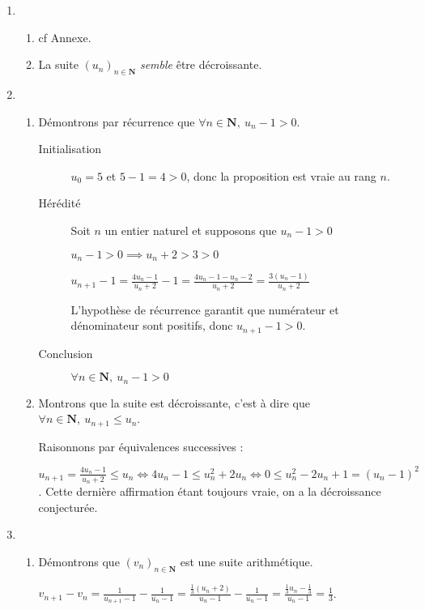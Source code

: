 \documentclass[12pt,a4paper,french]{article}
\newcommand{\N}{\mathbf{N}}
\renewcommand{\u}{(u_n)_{n\in\N}}
\begin{document}
\begin{solution}
  \begin{enumerate}
    \item \begin{enumerate}
      \item cf Annexe.
      \item La suite $\u$ \emph{semble} être décroissante.
    \end{enumerate}
  \item \begin{enumerate}
    \item Démontrons par récurrence que $\forall n\in\N,\ u_n -1 >
      0$.

      \begin{description}
        \item[Initialisation] $u_0 = 5$ et $5 - 1 = 4 > 0$, donc la
          proposition est vraie au rang $n$.
        \item[Hérédité] Soit $n$ un entier naturel et supposons que
          $u_n-1 > 0$

          $u_n - 1 > 0 \implies u_n + 2 > 3 > 0$

          $u_{n+1} - 1 = \frac{4u_n -1}{u_n+2} - 1 = \frac{4u_n - 1
          - u_n -2}{u_n + 2} = \frac{3(u_n -1)}{u_n+2}$

          L'hypothèse de récurrence garantit que numérateur et
          dénominateur sont positifs, donc $\boxed{u_{n+1} -1 > 0}$.
        \item[Conclusion] $\forall n \in \N,\ u_n -1 >0$
      \end{description}
    \item Montrons que la suite est décroissante, c'est à dire que
      $\forall n \in \N,\ u_{n+1} \leqslant u_n$.

      Raisonnons par équivalences successives :

      $u_{n+1} = \frac{4u_n -1}{u_n+2} \leqslant u_n \iff 4u_n -1
      \leqslant u_n^2 + 2u_n \iff 0\leqslant u_n^2 - 2u_n +1 = (u_n
      -1)^2$. Cette dernière affirmation étant toujours vraie, on a
      la décroissance conjecturée.
  \end{enumerate}
    \item \begin{enumerate}
      \item Démontrons que $(v_n)_{n\in\N}$ est une suite
        arithmétique.

        $v_{n+1} - v_n = \frac1{u_{n+1}-1} - \frac1{u_n -1} =
        \frac{\frac13(u_n + 2)}{u_n -1 } - \frac1{u_n -1} =
        \frac{\frac13 u_n - \frac13}{u_n -1} = \frac13$.


\end{enumerate}
\end{enumerate}
\end{solution}
\end{document}
